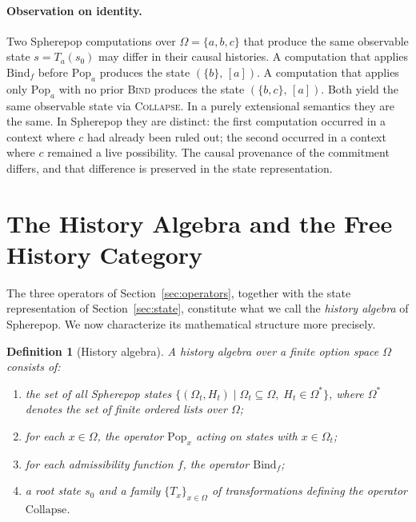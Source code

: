 \documentclass[12pt]{article}
\newtheorem{definition}{Definition}[section]
\begin{document}
\paragraph{Observation on identity.}

Two Spherepop computations over $\Omega = \{a, b, c\}$ that produce the same observable state $s = T_a(s_0)$ may differ in their causal histories. A computation that applies $\mathrm{Bind}_f$ before $\mathrm{Pop}_a$ produces the state $(\{b\},\, [a])$. A computation that applies only $\mathrm{Pop}_a$ with no prior \textsc{Bind} produces the state $(\{b, c\},\, [a])$. Both yield the same observable state via \textsc{Collapse}. In a purely extensional semantics they are the same. In Spherepop they are distinct: the first computation occurred in a context where $c$ had already been ruled out; the second occurred in a context where $c$ remained a live possibility. The causal provenance of the commitment differs, and that difference is preserved in the state representation.

\section{The History Algebra and the Free History Category}
\label{sec:algebra}

The three operators of Section~\ref{sec:operators}, together with the state representation of Section~\ref{sec:state}, constitute what we call the \emph{history algebra} of Spherepop. We now characterize its mathematical structure more precisely.

\begin{definition}[History algebra]
\label{def:histalg}
A \emph{history algebra} over a finite option space $\Omega$ consists of:
\begin{enumerate}
\item[(i)] the set of all Spherepop states $\{(\Omega_t, H_t) \mid \Omega_t \subseteq \Omega,\; H_t \in \Omega^*\}$, where $\Omega^*$ denotes the set of finite ordered lists over $\Omega$;
\item[(ii)] for each $x \in \Omega$, the operator $\mathrm{Pop}_x$ acting on states with $x \in \Omega_t$;
\item[(iii)] for each admissibility function $f$, the operator $\mathrm{Bind}_f$;
\item[(iv)] a root state $s_0$ and a family $\{T_x\}_{x\in\Omega}$ of transformations defining the operator $\mathrm{Collapse}$.
\end{enumerate}
\end{definition}
\end{document}
